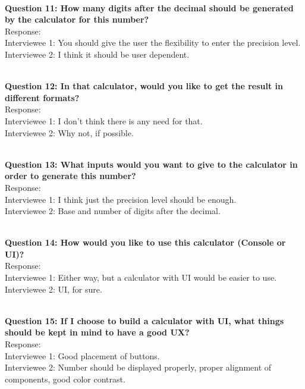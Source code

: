 \documentclass[paper=a4, fontsize=11pt]{scrartcl}
\numberwithin{equation}{section}		%
\numberwithin{figure}{section}			%
\numberwithin{table}{section}				%
\begin{document}
\begin{flushleft}
\setlength{\parskip}{\baselineskip}
\hrulefill
\\\textbf{Question 11: How many digits after the decimal should be generated by the calculator for this number?}
\\Response:
\\Interviewee 1: You should give the user the flexibility to enter the precision level.
\\Interviewee 2: I think it should be user dependent.
\end{flushleft}

\begin{flushleft}
\setlength{\parskip}{\baselineskip}
\hrulefill
\\\textbf{Question 12: In that calculator, would you like to get the result in different formats?}
\\Response:
\\Interviewee 1: I don't think there is any need for that.
\\Interviewee 2: Why not, if possible.
\end{flushleft}

\begin{flushleft}
\setlength{\parskip}{\baselineskip}
\hrulefill
\\\textbf{Question 13: What inputs would you want to give to the calculator in order to generate this number?}
\\Response:
\\Interviewee 1: I think just the precision level should be enough.
\\Interviewee 2: Base and number of digits after the decimal.
\end{flushleft}

\begin{flushleft}
\setlength{\parskip}{\baselineskip}
\hrulefill
\\\textbf{Question 14: How would you like to use this calculator (Console or UI)?}
\\Response:
\\Interviewee 1: Either way, but a calculator with UI would be easier to use.
\\Interviewee 2: UI, for sure.
\end{flushleft}

\begin{flushleft}
\setlength{\parskip}{\baselineskip}
\hrulefill
\\\textbf{Question 15: If I choose to build a calculator with UI, what things should be kept in mind to have a good UX?}
\\Response:
\\Interviewee 1: Good placement of buttons.
\\Interviewee 2: Number should be displayed properly, proper alignment of components, good color contrast.
\end{flushleft}
\end{document}
